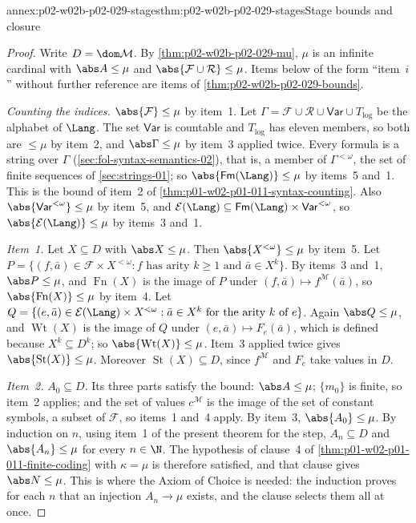 \begin{annexitem}{annex:p02-w02b-p02-029-stages}{thm:p02-w02b-p02-029-stages}{Stage bounds and closure}
\begin{proof}
Write \(D=\dom\mathcal M\). By \cref{thm:p02-w02b-p02-029-mu}, \(\mu\) is an
infinite cardinal with \(\abs A\leq\mu\) and
\(\abs{\mathcal F\cup\mathcal R}\leq\mu\). Items below of the form
``item~\(i\)'' without further reference are items of
\cref{thm:p02-w02b-p02-029-bounds}.

\emph{Counting the indices.} \(\abs{\mathcal F}\leq\mu\) by item~1. Let
\(\Gamma=\mathcal F\cup\mathcal R\cup\mathsf{Var}\cup T_{\mathrm{log}}\) be the
alphabet of \(\Lang\). The set \(\mathsf{Var}\) is countable and
\(T_{\mathrm{log}}\) has eleven members, so both are \(\leq\mu\) by item~2,
and \(\abs\Gamma\leq\mu\) by item~3 applied twice. Every formula is a string
over \(\Gamma\) (\cref{sec:fol-syntax-semantics-02}), that is, a member of
\(\Gamma^{<\omega}\), the set of finite sequences of \cref{sec:strings-01};
so \(\abs{\mathsf{Fm}(\Lang)}\leq\mu\) by items~5 and~1. This is the bound of
item~2 of \cref{thm:p01-w02-p01-011-syntax-counting}. Also
\(\abs{\mathsf{Var}^{<\omega}}\leq\mu\) by item~5, and
\(\mathcal E(\Lang)\subseteq\mathsf{Fm}(\Lang)\times\mathsf{Var}^{<\omega}\),
so \(\abs{\mathcal E(\Lang)}\leq\mu\) by items~3 and~1.

\emph{Item~1.} Let \(X\subseteq D\) with \(\abs X\leq\mu\). Then
\(\abs{X^{<\omega}}\leq\mu\) by item~5. Let
\(P=\{(f,\bar a)\in\mathcal F\times X^{<\omega}:f\text{ has arity }k\geq1
\text{ and }\bar a\in X^k\}\). By items~3 and~1, \(\abs P\leq\mu\), and
\(\operatorname{Fn}(X)\) is the image of \(P\) under
\((f,\bar a)\mapsto f^{\mathcal M}(\bar a)\), so
\(\abs{\operatorname{Fn}(X)}\leq\mu\) by item~4. Let
\(Q=\{(e,\bar a)\in\mathcal E(\Lang)\times X^{<\omega}:\bar a\in X^k\text{
for the arity }k\text{ of }e\}\). Again \(\abs Q\leq\mu\), and
\(\operatorname{Wt}(X)\) is the image of \(Q\) under
\((e,\bar a)\mapsto F_e(\bar a)\), which is defined because
\(X^k\subseteq D^k\); so \(\abs{\operatorname{Wt}(X)}\leq\mu\). Item~3
applied twice gives \(\abs{\operatorname{St}(X)}\leq\mu\). Moreover
\(\operatorname{St}(X)\subseteq D\), since \(f^{\mathcal M}\) and \(F_e\)
take values in \(D\).

\emph{Item~2.} \(A_0\subseteq D\). Its three parts satisfy the bound:
\(\abs A\leq\mu\); \(\{m_0\}\) is finite, so item~2 applies; and the set of
values \(c^{\mathcal M}\) is the image of the set of constant symbols, a
subset of \(\mathcal F\), so items~1 and~4 apply. By item~3,
\(\abs{A_0}\leq\mu\). By induction on \(n\), using item~1 of the present
theorem for the step, \(A_n\subseteq D\) and \(\abs{A_n}\leq\mu\) for every
\(n\in\N\). The hypothesis of clause~4 of
\cref{thm:p01-w02-p01-011-finite-coding} with \(\kappa=\mu\) is therefore
satisfied, and that clause gives \(\abs N\leq\mu\). This is where the
Axiom of Choice is needed: the induction proves for each \(n\) that an
injection \(A_n\to\mu\) exists, and the clause selects them all at once.


\end{proof}
\end{annexitem}
